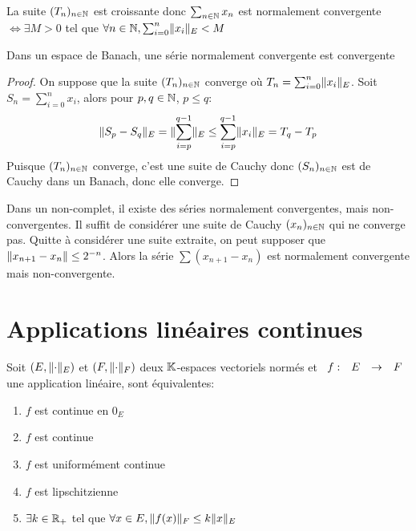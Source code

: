 \documentclass[]{report}
\begin{document}
    \begin{re}{}{}
        La suite $(T_n)_{n\in\mathbb{N}}$ est croissante donc $\sum_{n\in \mathbb{N}}x_n$ est normalement convergente $\iff \exists M>0$ tel que $\forall n\in \mathbb{N}, \sum_{i=0}^{n}\lVert x_i \rVert_E<M$
    \end{re}

    \begin{prop}{}{}
        Dans un espace de Banach, une série normalement convergente est convergente
    \end{prop}

    \begin{proof}
        On suppose que la suite $(T_n)_{n\in\mathbb{N}}$ converge où $T_n=\sum_{i=0}^{n}\lVert x_i \rVert_E$. Soit $S_n=\sum_{i=0}^{n}x_i$, alors pour $p,q\in \mathbb{N}$, $p\le q$:
        \[\lVert S_p-S_q \rVert_E=\lVert \sum_{i=p}^{q-1} \rVert_E\le \sum_{i=p}^{q-1}\lVert x_i \rVert_E=T_q-T_p\]
        Puisque $(T_n)_{n\in\mathbb{N}}$ converge, c'est une suite de Cauchy donc $(S_n)_{n\in\mathbb{N}}$ est de Cauchy dans un Banach, donc elle converge.
    \end{proof}

    \begin{re}{}{}
        Dans un \evn non-complet, il existe des séries normalement convergentes, mais non-convergentes. Il suffit de considérer une suite de Cauchy $(x_n)_{n\in\mathbb{N}}$ qui ne converge pas. Quitte à considérer une suite extraite, on peut supposer que $\lVert x_{n+1}-x_n \rVert\le 2^{-n}$. Alors la série $\sum (x_{n+1}-x_n)$ est normalement convergente mais non-convergente.
    \end{re}

    \section{Applications linéaires continues}

    \begin{tm}{}{}
        Soit $(E,\lVert \cdot \rVert_E)$ et $(F,\lVert \cdot \rVert_F)$ deux $\mathbb{K}$-espaces vectoriels normés et $\begin{array}{ccccc} f : & E & \to & F \end{array}$ une application linéaire, sont équivalentes:
        \begin{enumerate}
            \item $f$ est continue en $0_E$
            \item $f$ est continue
            \item $f$ est uniformément continue
            \item $f$ est lipschitzienne
            \item $\exists k\in \mathbb{R}_+$ tel que $\forall x\in E, \lVert f(x) \rVert_F\le k\lVert x \rVert_E$
        \end{enumerate}
    \end{tm}
\end{document}
